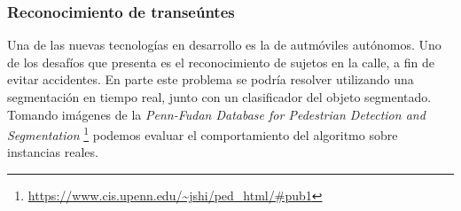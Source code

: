 \subsubsection{Reconocimiento de transeúntes}
Una de las nuevas tecnolog\'ias en desarrollo es la de autmóviles autónomos. Uno de los desaf\'ios que presenta es el reconocimiento de sujetos en la calle, a fin de evitar accidentes. En parte este problema se podr\'ia resolver utilizando una segmentaci\'on en tiempo real, junto con un clasificador del objeto segmentado. \\
Tomando im\'agenes de la \textit{Penn-Fudan Database for Pedestrian Detection and Segmentation} \footnote{\url{https://www.cis.upenn.edu/~jshi/ped_html/#pub1}} podemos evaluar el comportamiento del algoritmo sobre instancias reales.
\begin{figure}[H]
	\begin{center}
	\hspace{3mm}
	\caption{}
	\end{center}
	\label{Rec_tran}
\end{figure}
\vspace{-7mm}

